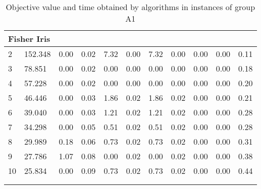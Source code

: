 {\begin{longtable}{@{}llccccccccc@{}}
\multicolumn{11}{l}{Fisher Iris}                                                                                                                                                                            \\ \hline
\multicolumn{1}{l|}{2}  & \multicolumn{1}{l|}{152.348}    & 0.00 & \multicolumn{1}{c|}{0.02} & 7.32 & \multicolumn{1}{c|}{0.00} & 7.32 & \multicolumn{1}{c|}{0.00} & 0.00           & 0.00           & 0.11 \\
\multicolumn{1}{l|}{3}  & \multicolumn{1}{l|}{78.851}     & 0.00 & \multicolumn{1}{c|}{0.02} & 0.00 & \multicolumn{1}{c|}{0.00} & 0.00 & \multicolumn{1}{c|}{0.00} & 0.00           & 0.00           & 0.18 \\
\multicolumn{1}{l|}{4}  & \multicolumn{1}{l|}{57.228}     & 0.00 & \multicolumn{1}{c|}{0.02} & 0.00 & \multicolumn{1}{c|}{0.00} & 0.00 & \multicolumn{1}{c|}{0.00} & 0.00           & 0.00           & 0.20 \\
\multicolumn{1}{l|}{5}  & \multicolumn{1}{l|}{46.446}     & 0.00 & \multicolumn{1}{c|}{0.03} & 1.86 & \multicolumn{1}{c|}{0.02} & 1.86 & \multicolumn{1}{c|}{0.02} & 0.00           & 0.00           & 0.21 \\
\multicolumn{1}{l|}{6}  & \multicolumn{1}{l|}{39.040}     & 0.00 & \multicolumn{1}{c|}{0.03} & 1.21 & \multicolumn{1}{c|}{0.02} & 1.21 & \multicolumn{1}{c|}{0.02} & 0.00           & 0.00           & 0.28 \\
\multicolumn{1}{l|}{7}  & \multicolumn{1}{l|}{34.298}     & 0.00 & \multicolumn{1}{c|}{0.05} & 0.51 & \multicolumn{1}{c|}{0.02} & 0.51 & \multicolumn{1}{c|}{0.02} & 0.00           & 0.00           & 0.28 \\
\multicolumn{1}{l|}{8}  & \multicolumn{1}{l|}{29.989}     & 0.18 & \multicolumn{1}{c|}{0.06} & 0.73 & \multicolumn{1}{c|}{0.02} & 0.73 & \multicolumn{1}{c|}{0.02} & 0.00           & 0.00           & 0.31 \\
\multicolumn{1}{l|}{9}  & \multicolumn{1}{l|}{27.786}     & 1.07 & \multicolumn{1}{c|}{0.08} & 0.00 & \multicolumn{1}{c|}{0.02} & 0.00 & \multicolumn{1}{c|}{0.02} & 0.00           & 0.00           & 0.38 \\
\multicolumn{1}{l|}{10} & \multicolumn{1}{l|}{25.834}     & 0.00 & \multicolumn{1}{c|}{0.09} & 0.73 & \multicolumn{1}{c|}{0.02} & 0.73 & \multicolumn{1}{c|}{0.02} & 0.00           & 0.00           & 0.44 \\ \hline
\caption{Objective value and time obtained by algorithms in instances of group A1}\\
\label{results-all-A1}\\
\end{longtable}}
